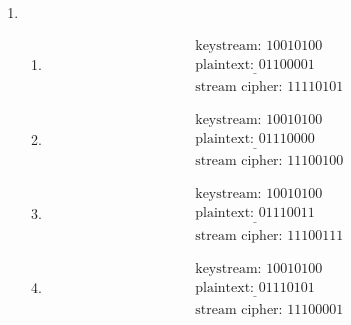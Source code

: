 \documentclass[12pt]{article}
\begin{document}
	\begin{enumerate}
	\item 
		\begin{enumerate}
		\item 
			\begin{align*}
			\text{keystream: }10010100&\\
			\underline{\text{plaintext: }01100001}&\\
			\text{stream cipher: }11110101&
			\end{align*}
		
		\item 
			\begin{align*}
			\text{keystream: }10010100&\\
			\underline{\text{plaintext: }01110000}&\\
			\text{stream cipher: }11100100&
			\end{align*}
		
		\item 
			\begin{align*}
			\text{keystream: }10010100&\\
			\underline{\text{plaintext: }01110011}&\\
			\text{stream cipher: }11100111&
			\end{align*}
		
		\item 
			\begin{align*}
			\text{keystream: }10010100&\\
			\underline{\text{plaintext: }01110101}&\\
			\text{stream cipher: }11100001&
			\end{align*}
		\end{enumerate}
		

\end{enumerate}
\end{document}
